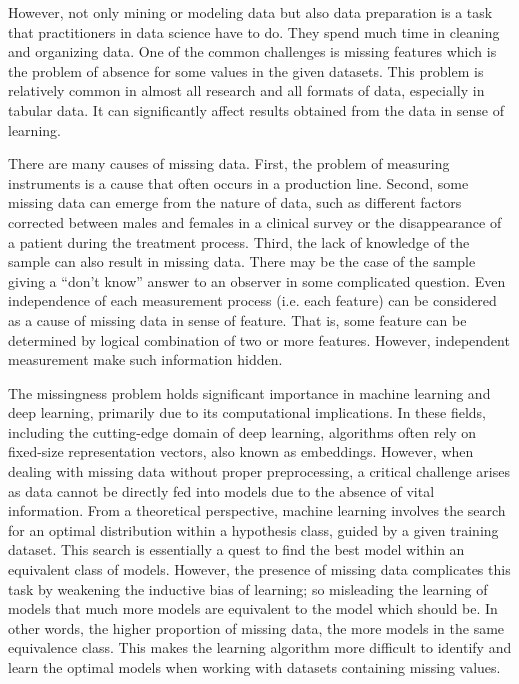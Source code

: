 However, not only mining or modeling data but also data preparation is a task that practitioners in data science have to do.
They spend much time in cleaning and organizing data.
One of the common challenges is missing features which is the problem of absence for some values in the given datasets.
This problem is relatively common in almost all research and all formats of data, especially in tabular data.
It can significantly affect results obtained from the data \cite{...} in sense of learning.


There are many causes of missing data.
First, the problem of measuring instruments is a cause that often occurs in a production line.
Second, some missing data can emerge from the nature of data,
such as different factors corrected between males and females in a clinical survey
or the disappearance of a patient during the treatment process.
Third, the lack of knowledge of the sample can also result in missing data.
There may be the case of the sample giving a ``don't know'' answer to an observer in some complicated question.
Even independence of each measurement process (i.e. each feature) can be considered as a cause of missing data in sense of feature.
That is, some feature can be determined by logical combination of two or more features.
However, independent measurement make such information hidden.

The missingness problem holds significant importance in machine learning and deep learning, primarily due to its computational implications.
In these fields, including the cutting-edge domain of deep learning, algorithms often rely on fixed-size representation vectors, also known as embeddings.
However, when dealing with missing data without proper preprocessing, a critical challenge arises as data cannot be directly fed into models due to the absence of vital information.
From a theoretical perspective, machine learning involves the search for an optimal distribution within a hypothesis class, guided by a given training dataset.
This search is essentially a quest to find the best model within an equivalent class of models.
However, the presence of missing data complicates this task by weakening the inductive bias of learning; so misleading the learning of models that much more models are equivalent to the model which should be.
In other words, the higher proportion of missing data, the more models in the same equivalence class.
This makes the learning algorithm more difficult to identify and learn the optimal models when working with datasets containing missing values.

